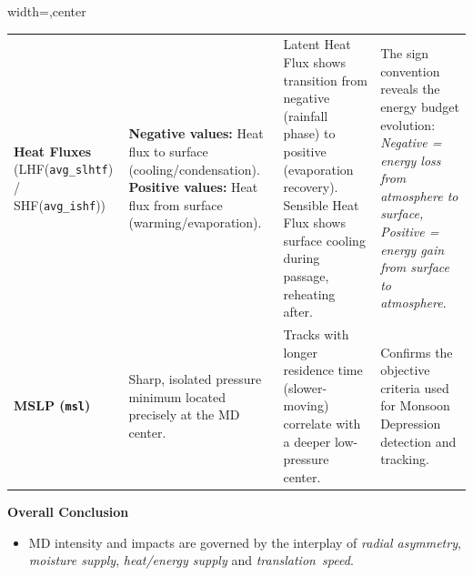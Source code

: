 \documentclass[aspectratio=169,t,xcolor=table]{beamer}
\begin{document}
\begin{frame}
\begin{adjustbox}{width=\textwidth,center}
\begin{tabular}{p{2.3cm} p{4.2cm} p{4.8cm} p{4.8cm}}
			\rowcolor{MyBlue!20}
			\textbf{Heat Fluxes} (LHF(\texttt{avg\_slhtf}) / SHF(\texttt{avg\_ishf}))                                                                                                      &
			\textbf{Negative values:} Heat flux to surface (cooling/condensation).
			\textbf{Positive values:} Heat flux from surface (warming/evaporation).                                                                                                        &
			Latent Heat Flux shows transition from negative (rainfall phase) to positive (evaporation recovery). Sensible Heat Flux shows surface cooling during passage, reheating after. &
			The sign convention reveals the energy budget evolution: \textit{Negative = energy loss from atmosphere to surface, Positive = energy gain from surface to atmosphere}.                                                                                                                                                                                                                                                                                                      \\
			\textbf{MSLP (\texttt{msl})}                                                                                                                                                   & Sharp, isolated pressure minimum located precisely at the MD center.                              & Tracks with longer residence time (slower-moving) correlate with a deeper low-pressure center. & Confirms the objective criteria used for Monsoon Depression detection and tracking.    \\
			\bottomrule
		\end{tabular}
	\end{adjustbox}

	\vspace{0.1cm}

	\begin{block}{\small \textbf{Overall Conclusion}}
		\footnotesize
		\begin{itemize}
			\item MD intensity and impacts are governed by the interplay of \textit{radial asymmetry}, \textit{moisture supply}, \textit{heat/energy supply} and \textit{translation~speed}.
		\end{itemize}
	\end{block}
\end{frame}
\end{document}

